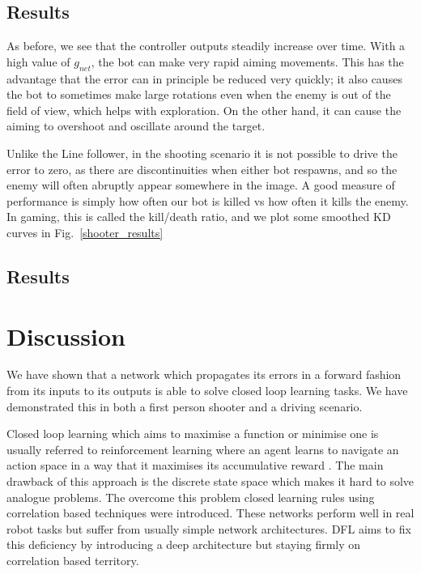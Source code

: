 \documentclass{llncs}
\begin{document}
\subsection{Results}

As before, we see that the controller outputs steadily increase over time. With a high value of $g_{net}$, the bot can make very rapid aiming movements. This has the advantage that the error can in principle be reduced very quickly; it also causes the bot to sometimes make large rotations even when the enemy is out of the field of view, which helps with exploration. On the other hand, it can cause the aiming to overshoot and oscillate around the target. 

Unlike the Line follower, in the shooting scenario it is not possible to drive the error to zero, as there are discontinuities when either bot respawns, and so the enemy will often abruptly appear somewhere in the image. A good measure of performance is simply how often our bot is killed vs how often it kills the enemy. In gaming, this is called the kill/death ratio, and we plot some smoothed KD curves in Fig.~\ref{shooter_results}



\subsection{Results}


\section{Discussion}
We have shown that a network which propagates its errors in a forward
fashion from its inputs to its outputs is able to solve closed loop
learning tasks. We have demonstrated this in both a first person
shooter and a driving scenario.

Closed loop learning which aims to maximise a function or minimise one
is usually referred to reinforcement learning where an agent learns to
navigate an action space in a way that it maximises its accumulative
reward \cite{Dayan1992}. The main drawback of this approach
is the discrete state space which makes it hard to solve analogue
problems. The overcome this problem closed learning rules using
correlation based techniques \cite{Verschure98summary} were introduced.
These networks perform well in real robot tasks but suffer from
usually simple network architectures. DFL aims to fix this
deficiency by introducing a deep architecture but staying firmly
on correlation based territory.
\end{document}
